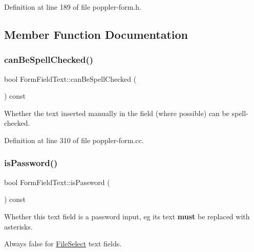Definition at line 189 of file poppler-\/form.\+h.



\subsection{Member Function Documentation}
\mbox{\label{class_poppler_1_1_form_field_text_af773274c028d59a376b41086b5d10e54}} 
\subsubsection{\texorpdfstring{can\+Be\+Spell\+Checked()}{canBeSpellChecked()}}
{\footnotesize\ttfamily bool Form\+Field\+Text\+::can\+Be\+Spell\+Checked (\begin{DoxyParamCaption}{ }\end{DoxyParamCaption}) const}

Whether the text inserted manually in the field (where possible) can be spell-\/checked. 

Definition at line 310 of file poppler-\/form.\+cc.

\mbox{\label{class_poppler_1_1_form_field_text_a35a02b24c20aa50b7c4ac7841a71d903}} 
\subsubsection{\texorpdfstring{is\+Password()}{isPassword()}}
{\footnotesize\ttfamily bool Form\+Field\+Text\+::is\+Password (\begin{DoxyParamCaption}{ }\end{DoxyParamCaption}) const}

Whether this text field is a password input, eg its text {\bfseries must} be replaced with asterisks.

Always false for \hyperlink{class_poppler_1_1_form_field_text_a0d67d9badab136dba73e75d3d1d945c2ae1ca658a5cfc13a17ecec3a9d9d3a8eb}{File\+Select} text fields. 

